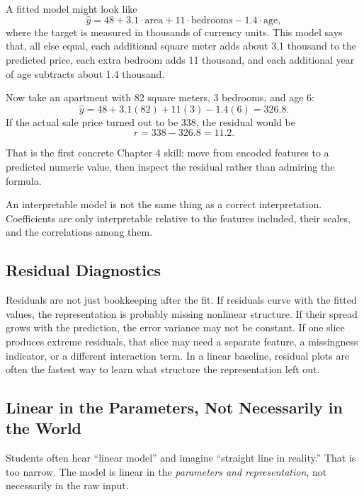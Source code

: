 A fitted model might look like
\[
\hat{y} = 48 + 3.1 \cdot \text{area} + 11 \cdot \text{bedrooms} - 1.4 \cdot \text{age},
\]
where the target is measured in thousands of currency units. This model says that, all else equal, each additional square meter adds about 3.1 thousand to the predicted price, each extra bedroom adds 11 thousand, and each additional year of age subtracts about 1.4 thousand.

Now take an apartment with 82 square meters, 3 bedrooms, and age 6:
\[
\hat{y} = 48 + 3.1(82) + 11(3) - 1.4(6) = 326.8.
\]
If the actual sale price turned out to be 338, the residual would be
\[
r = 338 - 326.8 = 11.2.
\]

That is the first concrete Chapter 4 skill: move from encoded features to a predicted numeric value, then inspect the residual rather than admiring the formula.

\begin{warningbox}
An interpretable model is not the same thing as a correct interpretation. Coefficients are only interpretable relative to the features included, their scales, and the correlations among them.
\end{warningbox}

\subsection{Residual Diagnostics}

Residuals are not just bookkeeping after the fit. If residuals curve with the fitted values, the representation is probably missing nonlinear structure. If their spread grows with the prediction, the error variance may not be constant. If one slice produces extreme residuals, that slice may need a separate feature, a missingness indicator, or a different interaction term. In a linear baseline, residual plots are often the fastest way to learn what structure the representation left out.

\subsection{Linear in the Parameters, Not Necessarily in the World}

Students often hear ``linear model'' and imagine ``straight line in reality.'' That is too narrow. The model is linear in the \emph{parameters and representation}, not necessarily in the raw input.

